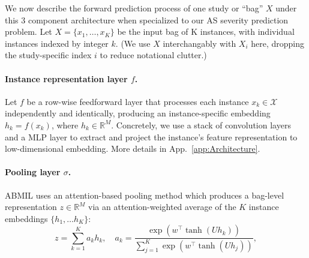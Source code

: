 
We now describe the forward prediction process of one study or ``bag'' $X$ under this 3 component architecture when specialized to our AS severity prediction problem.
Let $X = \{x_1, \ldots, x_K\}$ be the input bag of K instances, with individual instances indexed by integer $k$.
(We use $X$ interchangably with $X_i$ here, dropping the study-specific index $i$ to reduce notational clutter.)



\paragraph{Instance representation layer $f$.} 
Let $f$ be a row-wise feedforward layer that processes each instance $x_k \in \mathcal{X}$ independently and identically, producing an instance-specific embedding $h_k=f(x_k)$, where $h_k \in \mathbb{R}^{M}$. Concretely, we use a stack of convolution layers and a MLP layer to extract and project the instance's feature representation to low-dimensional embedding. More details in App.~\ref{app:Architecture}.

\paragraph{Pooling layer $\sigma$.}
ABMIL uses an attention-based pooling method which produces a bag-level representation $z \in \mathbb{R}^{M}$ via an attention-weighted average of the $K$ instance embeddings $\{h_1, \ldots h_K\}$:
\begin{equation}
    \label{eq:patient_embedding_abmil}
    z = \sum_{k=1}^K a_k h_k, \quad 
    a_k = \frac{\exp(w^\top \tanh(U h_k))}{\sum_{j=1}^K \exp(w^\top \tanh(U h_j))},
\end{equation} 

